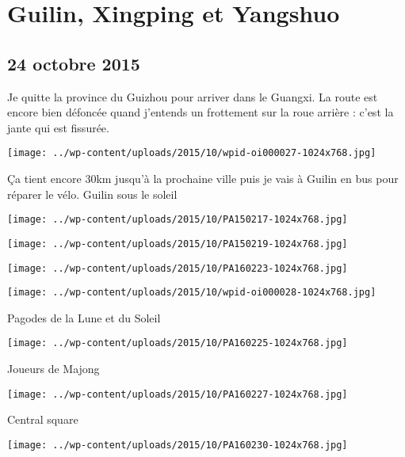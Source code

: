 \chapter{Guilin, Xingping et Yangshuo}
\section*{24 octobre 2015}
Je quitte la province du Guizhou pour arriver dans le Guangxi. La route est encore bien défoncée quand j'entends un frottement sur la roue arrière : c'est la jante qui est fissurée. \newline
 \newline
\centerline{\texttt{[image: ../wp-content/uploads/2015/10/wpid-oi000027-1024x768.jpg]} } 
 \newline
 Ça tient encore 30km jusqu'à la prochaine ville puis je vais à Guilin en bus pour réparer le vélo.  \newline
 Guilin sous le soleil \newline
 \newline
\centerline{\texttt{[image: ../wp-content/uploads/2015/10/PA150217-1024x768.jpg]} } 
 \newline
 \newline
\centerline{\texttt{[image: ../wp-content/uploads/2015/10/PA150219-1024x768.jpg]} } 
 \newline
 \newline
\centerline{\texttt{[image: ../wp-content/uploads/2015/10/PA160223-1024x768.jpg]} } 
 \newline
 \newline
\centerline{\texttt{[image: ../wp-content/uploads/2015/10/wpid-oi000028-1024x768.jpg]} } 
 \newline
 Pagodes de la Lune et du Soleil \newline
 \newline
\centerline{\texttt{[image: ../wp-content/uploads/2015/10/PA160225-1024x768.jpg]} } 
 \newline
 Joueurs de Majong \newline
 \newline
\centerline{\texttt{[image: ../wp-content/uploads/2015/10/PA160227-1024x768.jpg]} } 
 \newline
 Central square \newline
 \newline
\centerline{\texttt{[image: ../wp-content/uploads/2015/10/PA160230-1024x768.jpg]} } 
 \newline
